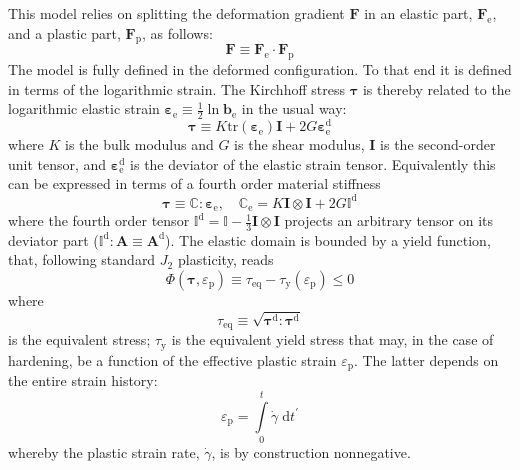 \documentclass[namecite, fleqn]{goose-article}
\newcommand\T[1]{\bm{{#1}}}
\newcommand\TT[1]{\mathbb{{#1}}}
\begin{document}
This model relies on splitting the deformation gradient $\T{F}$ in an elastic part,
$\T{F}_\mathrm{e}$, and a plastic part, $\T{F}_\mathrm{p}$, as follows:
\begin{equation}
    \T{F} \equiv \T{F}_\mathrm{e} \cdot \T{F}_\mathrm{p}
\end{equation}
The model is fully defined in the deformed configuration.
To that end it is defined in terms of
the logarithmic strain.
The Kirchhoff stress $\T{\tau}$ is thereby related to the
logarithmic elastic strain $\T{\varepsilon}_\mathrm{e} \equiv \tfrac{1}{2} \ln \T{b}_\mathrm{e}$
in the usual way:
\begin{equation}
    \T{\tau} \equiv K \mathrm{tr} \left( \T{\varepsilon}_\mathrm{e} \right) \T{I}
    + 2 G \T{\varepsilon}_\mathrm{e}^\mathrm{d}
\end{equation}
where $K$ is the bulk modulus and $G$ is the shear modulus,
$\T{I}$ is the second-order unit tensor,
and $\T{\varepsilon}_\mathrm{e}^\mathrm{d}$ is the deviator of the elastic strain tensor.
Equivalently this can be expressed in terms of a fourth order material stiffness
\begin{equation}
    \T{\tau} \equiv \TT{C} : \T{\varepsilon}_\mathrm{e},
    \quad
    \TT{C}_\mathrm{e} = K \T{I} \otimes \T{I} + 2 G \TT{I}^\mathrm{d}
    \label{eq:tangent:elas}
\end{equation}
where the fourth order tensor $\TT{I}^\mathrm{d} = \TT{I} - \tfrac{1}{3} \T{I} \otimes \T{I}$
projects an arbitrary tensor on its deviator part
($\TT{I}^\mathrm{d} : \T{A} \equiv \T{A}^\mathrm{d}$).
The elastic domain is bounded by a yield function, that,
following standard $J_2$ plasticity, reads
\begin{equation}
    \Phi(\T{\tau}, \varepsilon_\mathrm{p}) \equiv \tau_\mathrm{eq}
    - \tau_\mathrm{y}(\varepsilon_\mathrm{p}) \leq 0
\end{equation}
where
\begin{equation}
    \tau_\mathrm{eq} \equiv \sqrt{ \T{\tau}^\mathrm{d} : \T{\tau}^\mathrm{d} }
\end{equation}
is the equivalent stress; $\tau_\mathrm{y}$ is the equivalent yield stress that may,
in the case of hardening, be a function of the effective plastic strain $\varepsilon_\mathrm{p}$.
The latter depends on the entire strain history:
\begin{equation}
    \varepsilon_\mathrm{p} = \int\limits_0^t \dot{\gamma} \;\mathrm{d}t^\prime
    \label{eq:history}
\end{equation}
whereby the plastic strain rate, $\dot{\gamma}$, is by construction nonnegative.
\end{document}
